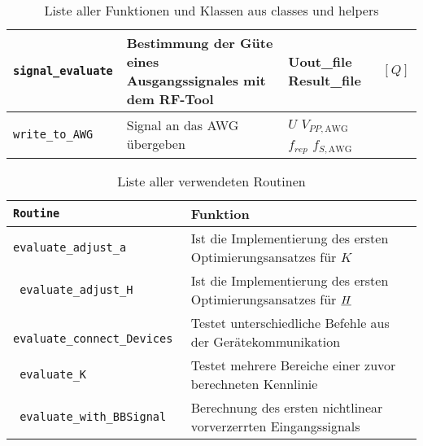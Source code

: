 \documentclass[../Report.tex]{subfiles}
\begin{document}
\begin{table}[H]
\begin{tabular}[t]{| >{\texttt\bgroup}m{3.5cm}<{\egroup}|m{8cm}|m{2cm}|m{2cm}|}
  \hline
  signal\_evaluate & Bestimmung der Güte eines Ausgangssignales mit dem RF-Tool & Uout\_file \newline Result\_file & $[Q]$\\
  \hline
  write\_to\_AWG & Signal an das AWG übergeben & $U$ \newline $V_{PP,\textrm{AWG}}$ $f_{rep}$ \newline $f_{S,\textrm{AWG}}$ &  \\
  \hline
\end{tabular}
\caption{Liste aller Funktionen und Klassen aus classes und helpers}
\label{tab:anhang.Funktionen.class.helpers}
\end{table}

\begin{table}[H]
\centering 
\begin{tabular}[t]{| >{\texttt\bgroup}m{6cm}<{\egroup}|m{8cm}|} 
  \hline
    \textrm{\textbf{Routine}} & \textbf{Funktion} \\ 
  \hline \hline
  evaluate\_adjust\_a & Ist die Implementierung des ersten Optimierungsansatzes für $K$ \\
  \hline
  evaluate\_adjust\_H & Ist die Implementierung des ersten Optimierungsansatzes für $\underline{H}$ \\
  \hline 
  evaluate\_connect\_Devices & Testet unterschiedliche Befehle aus der Gerätekommunikation \\
  \hline
  evaluate\_K & Testet mehrere Bereiche einer zuvor berechneten Kennlinie \\
  \hline
  evaluate\_with\_BBSignal & Berechnung des ersten nichtlinear vorverzerrten Eingangssignals \\
  \hline
\end{tabular}
\caption{Liste aller verwendeten Routinen}
\label{tab:anhang.Funktionen.routine}
\end{table}
\end{document}
